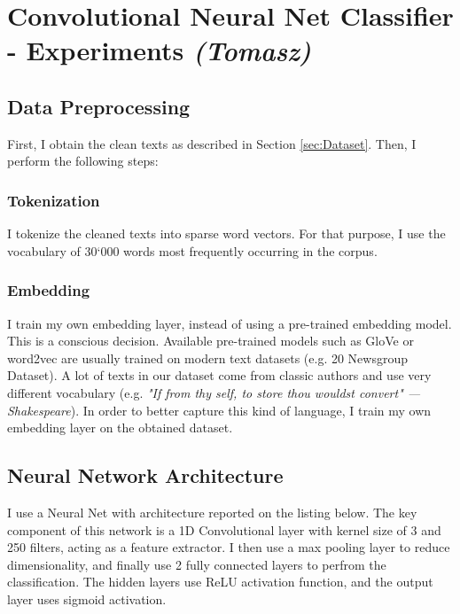\documentclass[journal,12pt,onecolumn]{IEEEtran}
\begin{document}

\section{Convolutional Neural Net Classifier - Experiments  \textit{(Tomasz)}}

\subsection{Data Preprocessing}

First, I obtain the clean texts as described in Section \ref{sec:Dataset}. Then, I perform the following steps:

\subsubsection{Tokenization} I tokenize the cleaned texts into sparse word vectors. For that purpose, I use the vocabulary of 30`000 words most frequently occurring in the corpus. 


\subsubsection{Embedding} I train my own embedding layer, instead of using a pre-trained embedding model. This is a conscious decision. Available pre-trained models such as GloVe or word2vec are usually trained on modern text datasets (e.g. 20 Newsgroup Dataset). A lot of texts in our dataset come from classic authors and use very different vocabulary (e.g. \textit{"If from thy self, to store thou wouldst convert"  --- Shakespeare}). In order to better capture this kind of language, I train my own embedding layer on the obtained dataset.

\subsection{Neural Network Architecture}

I use a Neural Net with architecture reported on the listing below. The key component of this network is a 1D Convolutional layer with kernel size of 3 and 250 filters, acting as a feature extractor. I then use a max pooling layer to reduce dimensionality, and finally use 2 fully connected layers to perfrom the classification. The hidden layers use ReLU activation function, and the output layer uses sigmoid activation.
\end{document}
